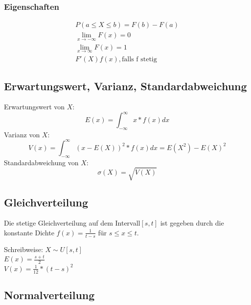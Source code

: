 \documentclass[10pt]{article}
\newtheorem[M]{definition}{Def.}
\newtheorem[M]{satz}{Satz}
\numberwithin{equation}{section}
\begin{document}
\subsubsection{Eigenschaften}
\begin{align}
P(a \leq X \leq b) = F(b)-F(a) \\
\lim_{x \rightarrow - \infty} F(x) = 0 \\
\lim_{x \rightarrow \infty} F(x) = 1 \\
F'(X) f(x), \text{falls f stetig}
\end{align}

\subsection{Erwartungswert, Varianz, Standardabweichung}
Erwartungswert von $X$:
\begin{equation}
E(x)=\int_{-\infty}^\infty x * f(x) dx
\end{equation}
Varianz von $X$:
\begin{equation}
V(x)=\int_{-\infty}^\infty (x - E(X))^2 * f(x) dx = E(X^2) - E(X)^2
\end{equation}
Standardabweichung von $X$:
\begin{equation}
\sigma(X) = \sqrt{V(X)}
\end{equation}
\subsection{Gleichverteilung}
\begin{definition}
Die stetige Gleichverteilung auf dem Intervall$[s,t]$ ist gegeben durch die konstante Dichte $f(x)=\frac{1}{t-s}$ für $s \leq x \leq t$. 
\end{definition}
Schreibweise: $X \sim U[s,t]$ \\
$E(x) = \frac{s + t}{2}$ \\
$V(x) = \frac{1}{12}*(t-s)^2$

\subsection{Normalverteilung}
\end{document}
